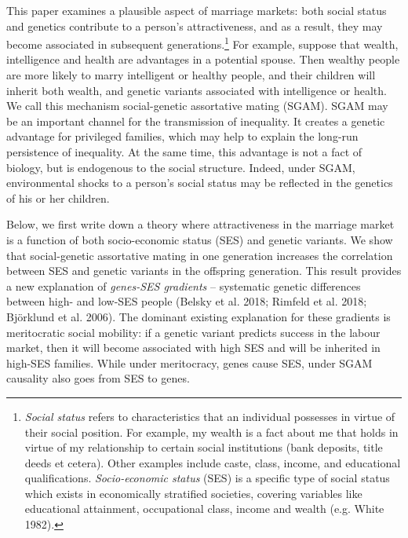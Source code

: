 \documentclass[
  12pt,
]{article}
\theoremstyle{definition}
\theoremstyle{definition}
\theoremstyle{definition}
\theoremstyle{definition}
\theoremstyle{remark}
\begin{document}
This paper examines a plausible aspect of marriage markets: both social
status and genetics contribute to a person's attractiveness, and as a
result, they may become associated in subsequent generations.\footnote{\emph{Social status} refers to characteristics that an individual
  possesses in virtue of their social position. For example, my wealth
  is a fact about me that holds in virtue of my relationship to
  certain social institutions (bank deposits, title deeds et cetera).
  Other examples include caste, class, income, and educational
  qualifications. \emph{Socio-economic status} (SES) is a specific type of
  social status which exists in economically stratified societies,
  covering variables like educational attainment, occupational class,
  income and wealth (e.g. White 1982).} For
example, suppose that wealth, intelligence and health are advantages in
a potential spouse. Then wealthy people are more likely to marry
intelligent or healthy people, and their children will inherit both
wealth, and genetic variants associated with intelligence or health. We
call this mechanism social-genetic assortative mating (SGAM). SGAM may
be an important channel for the transmission of inequality. It creates a
genetic advantage for privileged families, which may help to explain the
long-run persistence of inequality. At the same time, this advantage is
not a fact of biology, but is endogenous to the social structure.
Indeed, under SGAM, environmental shocks to a person's social status may
be reflected in the genetics of his or her children.

Below, we first write down a theory where attractiveness in the marriage
market is a function of both socio-economic status (SES) and genetic
variants. We show that social-genetic assortative mating in one
generation increases the correlation between SES and genetic variants in
the offspring generation. This result provides a new explanation of
\emph{genes-SES gradients} -- systematic genetic differences between high-
and low-SES people ({Belsky et al.} 2018; Rimfeld et al. 2018; Björklund et al. 2006). The dominant existing explanation for these
gradients is meritocratic social mobility: if a genetic variant predicts
success in the labour market, then it will become associated with high
SES and will be inherited in high-SES families. While under meritocracy,
genes cause SES, under SGAM causality also goes from SES to genes.
\end{document}
